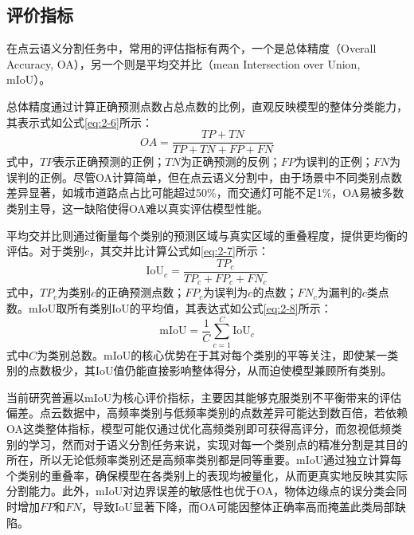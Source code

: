 \subsection{评价指标}
在点云语义分割任务中，常用的评估指标有两个，一个是总体精度（Overall Accuracy, OA），另一个则是平均交并比（mean Intersection over Union, mIoU）。

总体精度通过计算正确预测点数占总点数的比例，直观反映模型的整体分类能力，其表示式如公式\eqref{eq:2-6}所示：
\begin{equation}
    \label{eq:2-6}
    OA = \frac{TP + TN}{TP + TN + FP + FN}
\end{equation}
式中，$TP$表示正确预测的正例；$TN$为正确预测的反例；$FP$为误判的正例；$FN$为误判的正例。尽管OA计算简单，但在点云语义分割中，由于场景中不同类别点数差异显著，如城市道路点占比可能超过50\%，而交通灯可能不足1\%，OA易被多数类别主导，这一缺陷使得OA难以真实评估模型性能。

平均交并比则通过衡量每个类别的预测区域与真实区域的重叠程度，提供更均衡的评估。对于类别$c$，其交并比计算公式如\eqref{eq:2-7}所示：
\begin{equation}
    \label{eq:2-7}
    \text{IoU}_c = \frac{TP_c}{TP_c + FP_c + FN_c}
\end{equation}
式中，$TP_c$为类别$c$的正确预测点数；$FP_c$为误判为$c$的点数；$FN_c$为漏判的$c$类点数。mIoU取所有类别IoU的平均值，其表达式如公式\eqref{eq:2-8}所示：
\begin{equation}
    \label{eq:2-8}
    \text{mIoU} = \frac{1}{C} \sum_{c=1}^C \text{IoU}_c
\end{equation}
式中$C$为类别总数。mIoU的核心优势在于其对每个类别的平等关注，即使某一类别的点数极少，其IoU值仍能直接影响整体得分，从而迫使模型兼顾所有类别。

当前研究普遍以mIoU为核心评价指标，主要因其能够克服类别不平衡带来的评估偏差。点云数据中，高频率类别与低频率类别的点数差异可能达到数百倍，若依赖OA这类整体指标，模型可能仅通过优化高频类别即可获得高评分，而忽视低频类别的学习，然而对于语义分割任务来说，实现对每一个类别点的精准分割是其目的所在，所以无论低频率类别还是高频率类别都是同等重要。mIoU通过独立计算每个类别的重叠率，确保模型在各类别上的表现均被量化，从而更真实地反映其实际分割能力。此外，mIoU对边界误差的敏感性也优于OA，物体边缘点的误分类会同时增加$FP$和$FN$，导致IoU显著下降，而OA可能因整体正确率高而掩盖此类局部缺陷。%
